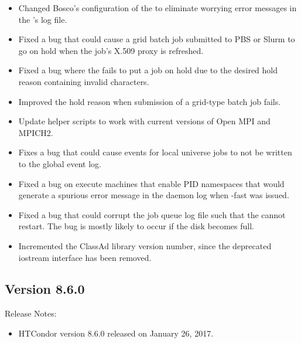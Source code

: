\begin{itemize}
\item Changed Bosco's configuration of the  to eliminate
worrying error messages in the 's log file.

\item Fixed a bug that could cause a grid batch job submitted to PBS or
Slurm to go on hold when the job's X.509 proxy is refreshed.

\item Fixed a bug where the  fails to put a job on
hold due to the desired hold reason containing invalid characters.

\item Improved the hold reason when submission of a grid-type batch
job fails.

\item Update helper scripts to work with current versions of Open MPI and MPICH2.

\item Fixes a bug that could cause events for local universe jobs to not
be written to the global event log.

\item Fixed a bug on execute machines that enable PID namespaces that
    would generate a spurious error message in the daemon log when  -fast was issued.

\item Fixed a bug that could corrupt the job queue log file such that
the  cannot restart.
The bug is mostly likely to occur if the disk becomes full.

\item Incremented the ClassAd library version number, since the deprecated
iostream interface has been removed.

\end{itemize}

\subsection*{\label{sec:New-8-6-0}Version 8.6.0}

\noindent Release Notes:

\begin{itemize}

\item HTCondor version 8.6.0 released on January 26, 2017.

\end{itemize}


